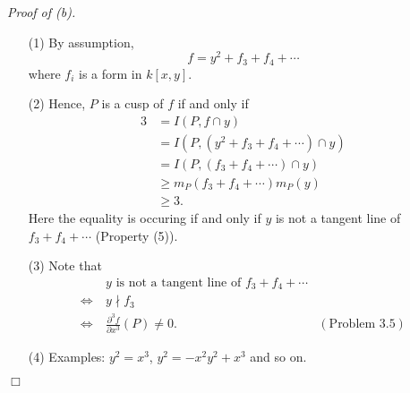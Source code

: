 \documentclass{article}
\begin{document}
\emph{Proof of (b).}
\begin{enumerate}
\item[(1)]
  By assumption,
  \[
    f = y^2 + f_3 + f_4 + \cdots
  \]
  where $f_i$ is a form in $k[x,y]$.

\item[(2)]
  Hence, $P$ is a cusp of $f$
  if and only if
  \begin{align*}
    3
    &= I(P, f \cap y) \\
    &= I(P, (y^2 + f_3 + f_4 + \cdots) \cap y) \\
    &= I(P, (f_3 + f_4 + \cdots) \cap y) \\
    &\geq m_P(f_3 + f_4 + \cdots) m_P(y) \\
    &\geq 3.
  \end{align*}
  Here the equality is occuring if and only if
  $y$ is not a tangent line of $f_3 + f_4 + \cdots$ (Property (5)).

\item[(3)]
  Note that
  \begin{align*}
    & \: \text{$y$ is not a tangent line of $f_3 + f_4 + \cdots$} \\
    \Longleftrightarrow & \:
    y \nmid f_3 \\
    \Longleftrightarrow & \:
    \frac{\partial^3 f}{\partial x^3}(P) \neq 0.
      &(\text{Problem 3.5})
  \end{align*}

\item[(4)]
  Examples: $y^2 = x^3$, $y^2 = -x^2 y^2 + x^3$ and so on.
\end{enumerate}
$\Box$ \\
\end{document}
